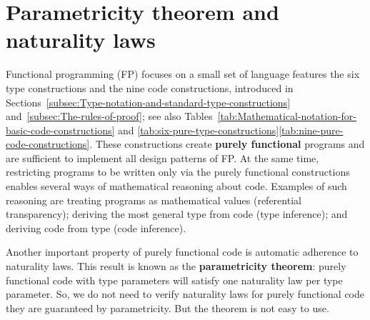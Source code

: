 \begin{comment}
your compiler does not have some critical bugs that allow it to oversee
that you have not followed the derivation rules of the logic that
is an extremely valuable feature of functional programming languages
that are based on the Curie habit correspondence you can prove their
safety at compile time or at least exclude a large number of possible
bugs and errors certainly these languages are quite large and they
include features that are not covered by the Carey Hart correspondence
type constructors that I have not considered in this tutorial and
those might may not be safe but at least the foundation of these languages
the foundation of the type system will be safe so that is the final
lesson from the great Howard correspondence this concludes the tutorial 
\end{comment}


\chapter{Parametricity theorem and naturality laws\label{chap:Proofs-of-naturality-parametricity}}

Functional programming (FP) focuses on a small set of language features
\textemdash{} the six type constructions and the nine code constructions,
introduced in Sections~\ref{subsec:Type-notation-and-standard-type-constructions}
and~\ref{subsec:The-rules-of-proof}; see also Tables~\ref{tab:Mathematical-notation-for-basic-code-constructions}
and \ref{tab:six-pure-type-constructions}\textendash \ref{tab:nine-pure-code-constructions}.
These constructions create \textbf{purely functional} programs
and are sufficient to implement all design patterns of FP. At the
same time, restricting programs to be written only via the purely
functional constructions enables several ways of mathematical reasoning
about code. Examples of such reasoning are treating programs as mathematical
values (referential transparency); deriving the most general type
from code (type inference); and deriving code from type (code inference).

Another important property of purely functional code is automatic
adherence to naturality laws. This result is known as the \textbf{parametricity
theorem}: purely functional code
with type parameters will satisfy one naturality law per type parameter.
So, we do not need to verify naturality laws for purely functional
code \textemdash{} they are guaranteed by parametricity. But the theorem
is not easy to use.

